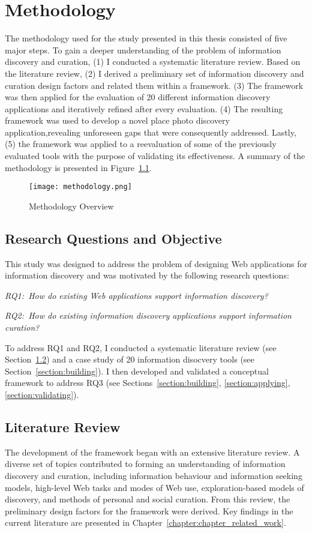 \chapter{Methodology}
\label{chapter:methodology}

The methodology used for the study presented in this thesis consisted of five major steps. To gain a deeper understanding of the problem of information discovery and curation, (1) I conducted a systematic literature review. Based on the literature review, (2) I derived a preliminary set of information discovery and curation design factors and related them within a framework. (3) The framework was then applied for the evaluation of 20 different information discovery applications and iteratively refined after every evaluation. (4) The resulting framework was used to develop a novel place photo discovery application,revealing unforeseen gaps that were consequently addressed. Lastly, (5) the framework was applied to a reevaluation of some of the previously evaluated tools with the purpose of validating its effectiveness.  A summary of the methodology is presented in Figure~\ref{fig:methodology}.
\begin{figure}[ht!]
	\noindent
	\centering
	\texttt{[image: methodology.png]}
	\caption{Methodology Overview}
	\label{fig:methodology} 
\end{figure}

{\section{Research Questions and Objective}
This study was designed to address the problem of designing Web applications for information discovery and was motivated by the following research questions:

\emph{RQ1:~How do existing Web applications support information discovery?}

\emph{RQ2:~How do existing information discovery applications support information curation?}

\pagebreak

To address RQ1 and RQ2, I conducted a systematic literature review (see Section~\ref{section:lit_review}) and a case study of 20 information disocvery tools (see Section~\ref{section:building}). I then developed and validated a conceptual framework to address RQ3 (see Sections~\ref{section:building}, \ref{section:applying}, \ref{section:validating}). 
}%

{\section{Literature Review}
\label{section:lit_review}
The development of the framework began with an extensive literature review. A diverse set of topics contributed to forming an understanding of information discovery and curation, including information behaviour and information seeking models, high-level Web tasks and modes of Web use, exploration-based models of discovery, and methods of personal and social curation. From this review, the preliminary design factors for the framework were derived. Key findings in the current literature are presented in Chapter~\ref{chapter:chapter_related_work}.
}%

